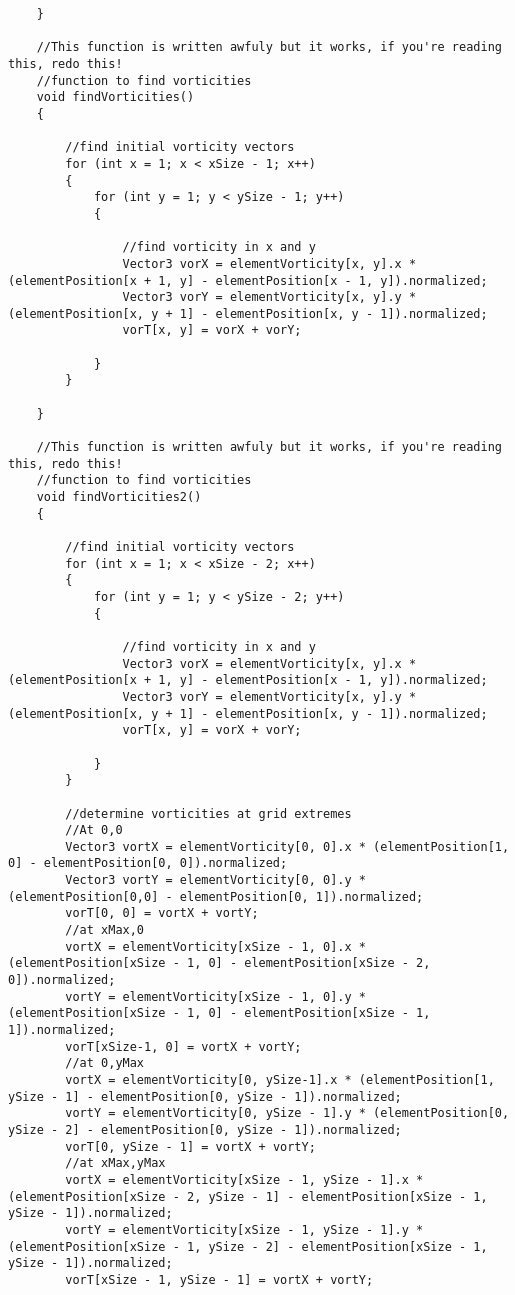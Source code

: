 \begin{mdframed}[linecolor=black, topline=true, bottomline=true,
  leftline=false, rightline=false]
\begin{verbatim}
    }

    //This function is written awfuly but it works, if you're reading this, redo this!
    //function to find vorticities
    void findVorticities()
    {

        //find initial vorticity vectors
        for (int x = 1; x < xSize - 1; x++)
        {
            for (int y = 1; y < ySize - 1; y++)
            {

                //find vorticity in x and y
                Vector3 vorX = elementVorticity[x, y].x * (elementPosition[x + 1, y] - elementPosition[x - 1, y]).normalized;
                Vector3 vorY = elementVorticity[x, y].y * (elementPosition[x, y + 1] - elementPosition[x, y - 1]).normalized;
                vorT[x, y] = vorX + vorY;

            }
        }

    }

    //This function is written awfuly but it works, if you're reading this, redo this!
    //function to find vorticities
    void findVorticities2()
    {

        //find initial vorticity vectors
        for (int x = 1; x < xSize - 2; x++)
        {
            for (int y = 1; y < ySize - 2; y++)
            {

                //find vorticity in x and y
                Vector3 vorX = elementVorticity[x, y].x * (elementPosition[x + 1, y] - elementPosition[x - 1, y]).normalized;
                Vector3 vorY = elementVorticity[x, y].y * (elementPosition[x, y + 1] - elementPosition[x, y - 1]).normalized;
                vorT[x, y] = vorX + vorY;

            }
        }

        //determine vorticities at grid extremes
        //At 0,0
        Vector3 vortX = elementVorticity[0, 0].x * (elementPosition[1, 0] - elementPosition[0, 0]).normalized;
        Vector3 vortY = elementVorticity[0, 0].y * (elementPosition[0,0] - elementPosition[0, 1]).normalized;
        vorT[0, 0] = vortX + vortY;
        //at xMax,0
        vortX = elementVorticity[xSize - 1, 0].x * (elementPosition[xSize - 1, 0] - elementPosition[xSize - 2, 0]).normalized;
        vortY = elementVorticity[xSize - 1, 0].y * (elementPosition[xSize - 1, 0] - elementPosition[xSize - 1, 1]).normalized;
        vorT[xSize-1, 0] = vortX + vortY;
        //at 0,yMax
        vortX = elementVorticity[0, ySize-1].x * (elementPosition[1, ySize - 1] - elementPosition[0, ySize - 1]).normalized;
        vortY = elementVorticity[0, ySize - 1].y * (elementPosition[0, ySize - 2] - elementPosition[0, ySize - 1]).normalized;
        vorT[0, ySize - 1] = vortX + vortY;
        //at xMax,yMax
        vortX = elementVorticity[xSize - 1, ySize - 1].x * (elementPosition[xSize - 2, ySize - 1] - elementPosition[xSize - 1, ySize - 1]).normalized;
        vortY = elementVorticity[xSize - 1, ySize - 1].y * (elementPosition[xSize - 1, ySize - 2] - elementPosition[xSize - 1, ySize - 1]).normalized;
        vorT[xSize - 1, ySize - 1] = vortX + vortY;


\end{verbatim}
\end{mdframed}
